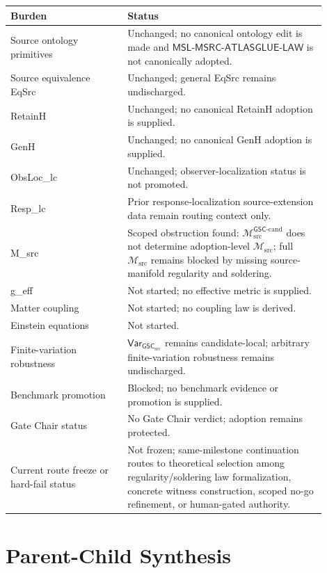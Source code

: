 \documentclass[11pt]{article}
\newcommand{\Msrc}{\mathcal{M}_{\mathrm{src}}}
\newcommand{\Mgsccand}{\mathcal{M}_{\mathrm{src}}^{\mathsf{GSC}\text{-}\mathrm{cand}}}
\newcommand{\GSC}{\mathsf{GSC}_{\mathrm{src}}}
\newcommand{\Vargsc}{\mathsf{Var}_{\GSC}}
\newcommand{\MSL}{\mathsf{MSL}\mbox{-}\mathsf{MSRC}\mbox{-}\mathsf{ATLASGLUE}\mbox{-}\mathsf{LAW}}
\begin{document}
\begin{center}
\begin{tabular}{p{0.33\linewidth}p{0.57\linewidth}}
\hline
Burden & Status \\
\hline
Source ontology primitives & Unchanged; no canonical ontology edit is made and \(\MSL\) is not canonically adopted. \\
Source equivalence EqSrc & Unchanged; general EqSrc remains undischarged. \\
RetainH & Unchanged; no canonical RetainH adoption is supplied. \\
GenH & Unchanged; no canonical GenH adoption is supplied. \\
ObsLoc\_lc & Unchanged; observer-localization status is not promoted. \\
Resp\_lc & Prior response-localization source-extension data remain routing context only. \\
M\_src & Scoped obstruction found: \(\Mgsccand\) does not determine adoption-level \(\Msrc\); full \(\Msrc\) remains blocked by missing source-manifold regularity and soldering. \\
g\_eff & Not started; no effective metric is supplied. \\
Matter coupling & Not started; no coupling law is derived. \\
Einstein equations & Not started. \\
Finite-variation robustness & \(\Vargsc\) remains candidate-local; arbitrary finite-variation robustness remains undischarged. \\
Benchmark promotion & Blocked; no benchmark evidence or promotion is supplied. \\
Gate Chair status & No Gate Chair verdict; adoption remains protected. \\
Current route freeze or hard-fail status & Not frozen; same-milestone continuation routes to theoretical selection among regularity/soldering law formalization, concrete witness construction, scoped no-go refinement, or human-gated authority. \\
\hline
\end{tabular}
\end{center}

\section{Parent-Child Synthesis}
\end{document}
